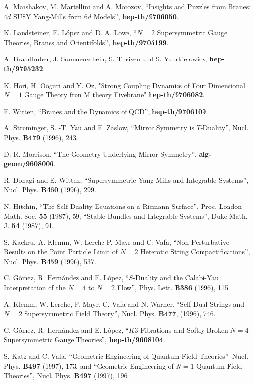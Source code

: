 \begin{thebibliography}{99}
 A. Marshakov, M. Martellini and A. Morozov, ``Insights and Puzzles 
from Branes: $4d$
SUSY Yang-Mills from $6d$ Models'', {\bf hep-th/9706050}.

 K. Landsteiner, E. L\'opez and D. A. Lowe, ``$N=2$ 
Supersymmetric Gauge Theories, Branes and Orientifolds'', {\bf hep-th/9705199}.

 A. Brandhuber, J. Sommenschein, S. Theisen and S.
Yanckielowicz, {\bf hep-th/9705232}.
 
 K. Hori, H. Ooguri and Y. Oz, "Strong Coupling 
Dynamics of Four Dimensional $N=1$ Gauge Theory fron M theory 
Fivebrane" {\bf hep-th/9706082}.  

 E. Witten, ``Branes and the Dynamics of QCD'',
{\bf hep-th/9706109}.

 A. Strominger, S. -T. Yau and E. Zaslow, ``Mirror
Symmetry is $T$-Duality'', Nucl. Phys. {\bf B479} (1996), 243.

 D. R. Morrison, ``The Geometry Underlying Mirror
Symmetry'', {\bf alg-geom/9608006}.

 R. Donagi and E. Witten, ``Supersymmetric Yang-Mills
and Integrable Systems'', Nucl. Phys. {\bf B460} (1996), 299.

 N. Hitchin, ``The Self-Duality Equations on a Riemann
Surface'', Proc. London Math. Soc. {\bf 55} (1987), 59; ``Stable
Bundles and Integrable Systems'', Duke Math. J. {\bf 54} (1987),
91.

 S. Kachru, A. Klemm, W. Lerche P. Mayr and C:
Vafa, ``Non Perturbative Results on the Point Particle Limit of
$N=2$ Heterotic String Compactifications'', Nucl. Phys. {\bf
B459} (1996), 537. 

 C. G\'omez, R. Hern\'andez and E. L\'opez,
``$S$-Duality and the Calabi-Yau Interpretation of the $N=4$ to
$N=2$ Flow'', Phys. Lett. {\bf B386} (1996), 115.

 A. Klemm, W. Lerche, P. Mayr, C. Vafa and N.
Warner, ``Self-Dual Strings and $N=2$ Supersymmetric Field
Theory'', Nucl. Phys. {\bf B477}, (1996), 746. 

 C. G\'omez, R. Hern\'andez and E. L\'opez,
``$K3$-Fibrations and Softly Broken $N=4$ Supersymmetric Gauge
Theories'', {\bf hep-th/9608104}.

 S. Katz and C. Vafa, ``Geometric Engineering of 
Quantum Field Theories'', Nucl. Phys. {\bf B497} (1997), 173, and ``Geometric Engineering of
$N=1$ Quantum Field Theories'', Nucl. Phys. {\bf B497} (1997), 196.


\end{thebibliography}
